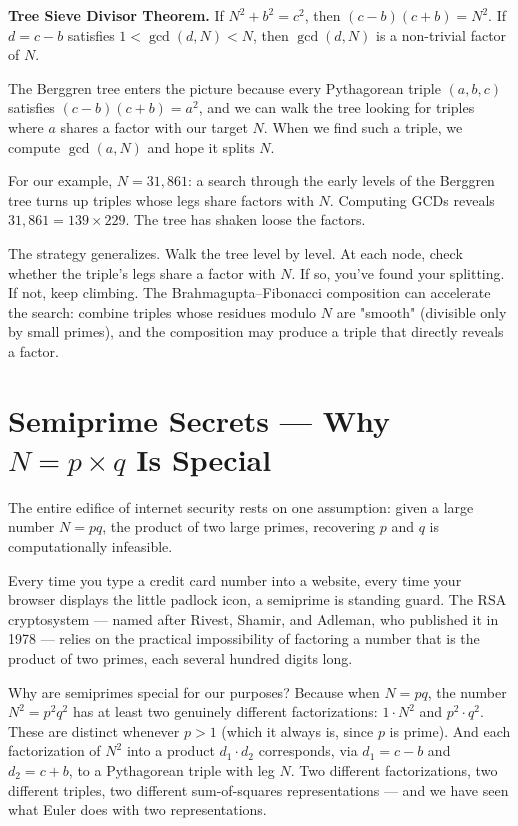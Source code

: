 \documentclass[11pt,twoside,openright]{book}
\theoremstyle{definition}
\theoremstyle{remark}
\begin{document}
\textbf{Tree Sieve Divisor Theorem.} If $N^2 + b^2 = c^2$, then $(c - b)(c + b) = N^2$. If $d = c - b$ satisfies $1 < \gcd(d, N) < N$, then $\gcd(d, N)$ is a non-trivial factor of $N$.

The Berggren tree enters the picture because every Pythagorean triple $(a, b, c)$ satisfies $(c - b)(c + b) = a^2$, and we can walk the tree looking for triples where $a$ shares a factor with our target $N$. When we find such a triple, we compute $\gcd(a, N)$ and hope it splits $N$.


For our example, $N = 31{,}861$: a search through the early levels of the Berggren tree turns up triples whose legs share factors with $N$. Computing GCDs reveals $31{,}861 = 139 \times 229$. The tree has shaken loose the factors.


The strategy generalizes. Walk the tree level by level. At each node, check whether the triple's legs share a factor with $N$. If so, you've found your splitting. If not, keep climbing. The Brahmagupta--Fibonacci composition can accelerate the search: combine triples whose residues modulo $N$ are "smooth" (divisible only by small primes), and the composition may produce a triple that directly reveals a factor.


\section{Semiprime Secrets --- Why $N = p \times q$ Is Special}

The entire edifice of internet security rests on one assumption: given a large number $N = pq$, the product of two large primes, recovering $p$ and $q$ is computationally infeasible.

Every time you type a credit card number into a website, every time your browser displays the little padlock icon, a semiprime is standing guard. The RSA cryptosystem --- named after Rivest, Shamir, and Adleman, who published it in 1978 --- relies on the practical impossibility of factoring a number that is the product of two primes, each several hundred digits long.

Why are semiprimes special for our purposes? Because when $N = pq$, the number $N^2 = p^2 q^2$ has at least two genuinely different factorizations: $1 \cdot N^2$ and $p^2 \cdot q^2$. These are distinct whenever $p > 1$ (which it always is, since $p$ is prime). And each factorization of $N^2$ into a product $d_1 \cdot d_2$ corresponds, via $d_1 = c - b$ and $d_2 = c + b$, to a Pythagorean triple with leg $N$. Two different factorizations, two different triples, two different sum-of-squares representations --- and we have seen what Euler does with two representations.
\end{document}

